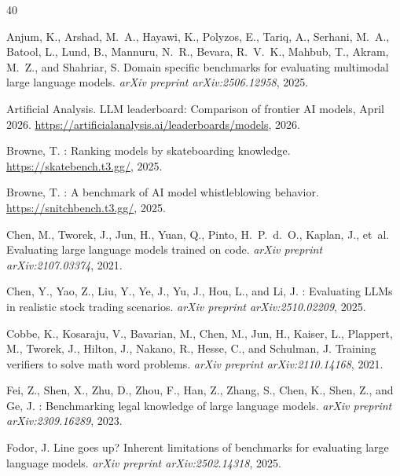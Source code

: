 \documentclass[11pt,a4paper]{article}
\begin{document}
\begin{thebibliography}{40}

Anjum, K., Arshad, M.~A., Hayawi, K., Polyzos, E., Tariq, A., Serhani, M.~A., Batool, L., Lund, B., Mannuru, N.~R., Bevara, R.~V.~K., Mahbub, T., Akram, M.~Z., and Shahriar, S.
\newblock Domain specific benchmarks for evaluating multimodal large language models.
\newblock \emph{arXiv preprint arXiv:2506.12958}, 2025.

Artificial Analysis.
\newblock LLM leaderboard: Comparison of frontier AI models, April 2026.
\newblock \url{https://artificialanalysis.ai/leaderboards/models}, 2026.

Browne, T.
: Ranking models by skateboarding knowledge.
\newblock \url{https://skatebench.t3.gg/}, 2025.

Browne, T.
: A benchmark of {AI} model whistleblowing behavior.
\newblock \url{https://snitchbench.t3.gg/}, 2025.

Chen, M., Tworek, J., Jun, H., Yuan, Q., Pinto, H.~P.~d.~O., Kaplan, J., et~al.
\newblock Evaluating large language models trained on code.
\newblock \emph{arXiv preprint arXiv:2107.03374}, 2021.

Chen, Y., Yao, Z., Liu, Y., Ye, J., Yu, J., Hou, L., and Li, J.
: Evaluating {LLMs} in realistic stock trading scenarios.
\newblock \emph{arXiv preprint arXiv:2510.02209}, 2025.

Cobbe, K., Kosaraju, V., Bavarian, M., Chen, M., Jun, H., Kaiser, L., Plappert, M., Tworek, J., Hilton, J., Nakano, R., Hesse, C., and Schulman, J.
\newblock Training verifiers to solve math word problems.
\newblock \emph{arXiv preprint arXiv:2110.14168}, 2021.

Fei, Z., Shen, X., Zhu, D., Zhou, F., Han, Z., Zhang, S., Chen, K., Shen, Z., and Ge, J.
: Benchmarking legal knowledge of large language models.
\newblock \emph{arXiv preprint arXiv:2309.16289}, 2023.

Fodor, J.
\newblock Line goes up? {I}nherent limitations of benchmarks for evaluating large language models.
\newblock \emph{arXiv preprint arXiv:2502.14318}, 2025.


\end{thebibliography}
\end{document}
